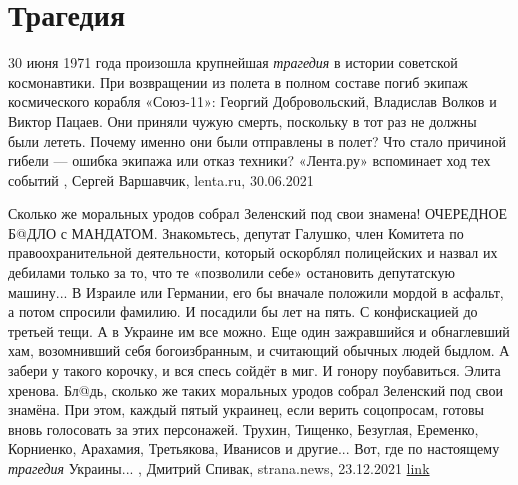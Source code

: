  
 
 
 
 
\chapter{Трагедия}
\label{sec:slova.tragedia}

30 июня 1971 года произошла крупнейшая \emph{трагедия} в истории советской
космонавтики. При возвращении из полета в полном составе погиб экипаж
космического корабля «Союз-11»: Георгий Добровольский, Владислав Волков и
Виктор Пацаев. Они приняли чужую смерть, поскольку в тот раз не должны были
лететь. Почему именно они были отправлены в полет? Что стало причиной гибели —
ошибка экипажа или отказ техники? «Лента.ру» вспоминает ход тех событий
,
Сергей Варшавчик, lenta.ru, 30.06.2021

Сколько же моральных уродов собрал Зеленский под свои знамена!  ОЧЕРЕДНОЕ Б@ДЛО
с МАНДАТОМ. Знакомьтесь, депутат Галушко, член Комитета по правоохранительной
деятельности, который оскорблял полицейских и назвал их дебилами только за то,
что те «позволили себе» остановить депутатскую машину...  В Израиле или
Германии, его бы вначале положили мордой в асфальт, а потом спросили фамилию. И
посадили бы лет на пять. С конфискацией до третьей тещи.  А в Украине им все
можно. Еще один зажравшийся и обнаглевший хам, возомнивший себя богоизбранным,
и считающий обычных людей быдлом. А забери у такого корочку, и вся спесь сойдёт
в миг. И гонору поубавиться. Элита хренова.  Бл@дь, сколько же таких моральных
уродов собрал Зеленский под свои знамёна. При этом, каждый пятый украинец, если
верить соцопросам, готовы вновь голосовать за этих персонажей. Трухин, Тищенко,
Безуглая, Еременко, Корниенко, Арахамия, Третьякова, Иванисов и другие...  Вот,
где по настоящему \emph{трагедия} Украины...
, 
Дмитрий Спивак, strana.news, 23.12.2021
\href{https://strana.news/opinions/368459-eshche-odin-zazhravshijsja-kham-vozomnivshij-sebja-bohoizbrannym.html}{link}
